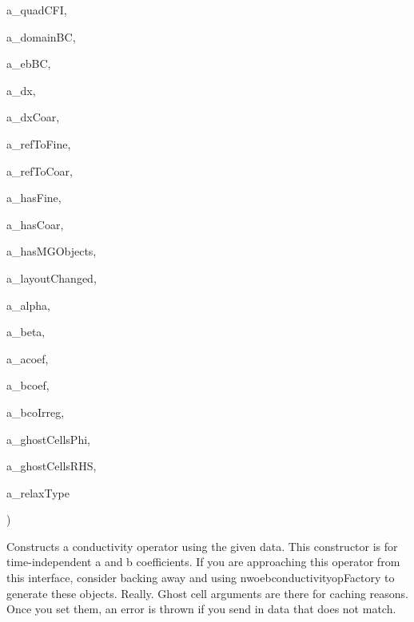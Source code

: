 {\begin{DoxyParamCaption}
\item[{const Ref\+Counted\+Ptr$<$ {\bf nwoebquadcfinterp} $>$ \&}]{a\+\_\+quad\+C\+FI, }
\item[{const Ref\+Counted\+Ptr$<$ Conductivity\+Base\+Domain\+BC $>$ \&}]{a\+\_\+domain\+BC, }
\item[{const Ref\+Counted\+Ptr$<$ Conductivity\+Base\+E\+B\+BC $>$ \&}]{a\+\_\+eb\+BC, }
\item[{const Real \&}]{a\+\_\+dx, }
\item[{const Real \&}]{a\+\_\+dx\+Coar, }
\item[{const int \&}]{a\+\_\+ref\+To\+Fine, }
\item[{const int \&}]{a\+\_\+ref\+To\+Coar, }
\item[{const bool \&}]{a\+\_\+has\+Fine, }
\item[{const bool \&}]{a\+\_\+has\+Coar, }
\item[{const bool \&}]{a\+\_\+has\+M\+G\+Objects, }
\item[{const bool \&}]{a\+\_\+layout\+Changed, }
\item[{const Real \&}]{a\+\_\+alpha, }
\item[{const Real \&}]{a\+\_\+beta, }
\item[{const Ref\+Counted\+Ptr$<$ Level\+Data$<$ E\+B\+Cell\+F\+AB $>$ $>$ \&}]{a\+\_\+acoef, }
\item[{const Ref\+Counted\+Ptr$<$ Level\+Data$<$ E\+B\+Flux\+F\+AB $>$ $>$ \&}]{a\+\_\+bcoef, }
\item[{const Ref\+Counted\+Ptr$<$ Level\+Data$<$ Base\+I\+V\+F\+AB$<$ Real $>$ $>$ $>$ \&}]{a\+\_\+bco\+Irreg, }
\item[{const Int\+Vect \&}]{a\+\_\+ghost\+Cells\+Phi, }
\item[{const Int\+Vect \&}]{a\+\_\+ghost\+Cells\+R\+HS, }
\item[{const int \&}]{a\+\_\+relax\+Type}
\end{DoxyParamCaption}
)}\hypertarget{classnwoebconductivityop_a0ac9814967901258a58ea81883d05db7}{}\label{classnwoebconductivityop_a0ac9814967901258a58ea81883d05db7}
Constructs a conductivity operator using the given data. This constructor is for time-\/independent a and b coefficients. If you are approaching this operator from this interface, consider backing away and using nwoebconductivityop\+Factory to generate these objects. Really. Ghost cell arguments are there for caching reasons. Once you set them, an error is thrown if you send in data that does not match. 
